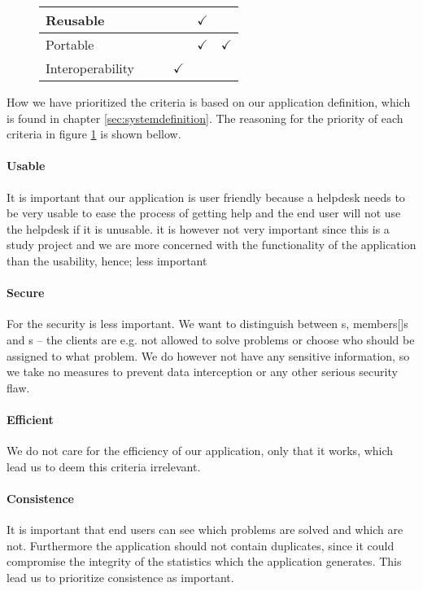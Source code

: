 \begin{figure}[h]
\begin{tabular}{| l | m{} | m{}| m{}| m{}|m{}|}
		Reusable  					& 																				& 																			& 																		& \multicolumn{1}{c|}{$\checkmark$} & 																	\\ \hline
		Portable 						& 																				& 																			& 																		& \multicolumn{1}{c|}{$\checkmark$} &	\multicolumn{1}{c|}{$\checkmark$} \\ \hline
		Interoperability 		& 																				& 																			& \multicolumn{1}{c|}{$\checkmark$} 	& 																	& 																	\\ \hline
		\end{tabular}
	\label{fig:prioritizedCrit}
\end{figure}

How we have prioritized the criteria is based on our application definition, which is found in chapter \ref{sec:systemdefinition}. The reasoning for the priority of each criteria in figure \ref{fig:prioritizedCrit} is shown bellow.

\paragraph{Usable}

It is important that our application is user friendly because a helpdesk needs to be very usable to ease the process of getting help and the end user will not use the helpdesk if it is unusable.
it is however not very important since this is a study project and we are more concerned with the functionality of the application than the usability, hence; less important 
\paragraph{Secure}
For the \hdesk[] security is less important. We want to distinguish between \aclient[]s, \astaff members[]s and \admin[]s -- the clients are e.g. not allowed to solve problems or choose who should be assigned to what problem.
We do however not have any sensitive information, so we take no measures to prevent data interception or any other serious security flaw.
\paragraph{Efficient}
We do not care for the efficiency of our application, only that it works, which lead us to deem this criteria irrelevant. 
\paragraph{Consistence}
It is important that end users can see which problems are solved and which are not.
Furthermore the application should not contain duplicates, since it could compromise the integrity of the statistics which the application generates.
This lead us to prioritize consistence as important.
